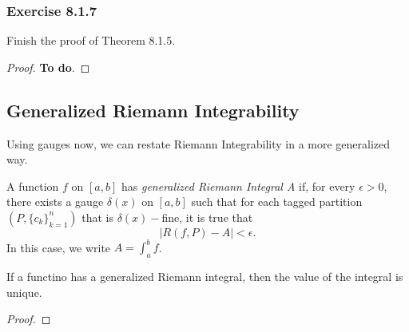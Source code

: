 \subsubsection{Exercise 8.1.7} Finish the proof of Theorem 8.1.5.
\begin{proof}
    \textbf{To do}.
\end{proof}

\subsection{Generalized Riemann Integrability} 
Using gauges now, we can restate Riemann Integrability in a more generalized way.
\begin{tcolorbox}
\begin{defn}
    A function \( f  \) on \( [a,b]  \) has \textit{generalized Riemann Integral A} if, for every \( \epsilon > 0  \), there exists a gauge \( \delta(x)  \) on \( [a,b]  \) such that for each tagged partition \( (P, \{ c_{k } \}_{k=1}^n) \) that is \( \delta(x)- \)fine, it is true that 
    \[  | R(f,P) - A  | <\epsilon. \] In this case, we write \( A = \int_{ a }^{ b } f \).
\end{defn}
\end{tcolorbox}

\begin{tcolorbox}
\begin{thm}
If a functino has a generalized Riemann integral, then the value of the integral is unique.
\end{thm}
\end{tcolorbox}

\begin{proof}

\end{proof}






